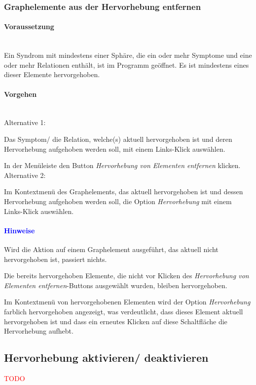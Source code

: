 \documentclass[enabledeprecatedfontcommands,fontsize=11pt,paper=a4,twoside]{scrartcl}
\newcommand*{\red}{\textcolor{red}}
\newcounter{one}
\newcounter{two}[one]
\newcommand*{\hint}{\paragraph{\textcolor{blue}{Hinweise}}}
\newcommand*{\condition}{\paragraph{Voraussetzung}$\;$ \vspace{0.2cm}\\}
\newcommand*{\actions}{\paragraph{Vorgehen} $\;$\vspace{0.2cm}\\}
\newcommand*{\aOne}{\textcolor{bbe}{Alternative 1:}}
\newcommand*{\aTwo}{\textcolor{bbe}{Alternative 2:}}
\let\tempone\itemize
\let\temptwo\enditemize
\renewenvironment{itemize}{\tempone\addtolength{\itemsep}{-10.0pt}}{\temptwo}
\let\origenumerate\enumerate
\let\origendenumerate\endenumerate
\renewenvironment{enumerate}{\origenumerate \addtolength{\itemsep}{-10.0pt}}{\origendenumerate}
\begin{document}
\subsubsection{Graphelemente aus der Hervorhebung entfernen}
		\condition 	
		Ein Syndrom mit mindestens einer Sphäre, die ein oder mehr Symptome und eine oder mehr Relationen enthält, ist im Programm geöffnet. Es ist mindestens eines dieser Elemente hervorgehoben.
		\actions
		\aOne
		\begin{enumerate}
			\item Das Symptom/ die Relation, welche(s) aktuell hervorgehoben ist und deren Hervorhebung aufgehoben werden soll, mit einem Links-Klick auswählen. 
			\item In der Menüleiste den Button \textit{Hervorhebung von Elementen entfernen} klicken.
		\end{enumerate}
		\aTwo
		\begin{enumerate}
			\item Im Kontextmenü des Graphelements, das aktuell hervorgehoben ist und dessen Hervorhebung aufgehoben werden soll, die Option \textit{Hervorhebung} mit einem Links-Klick auswählen.
		\end{enumerate}
		\hint
		\begin{itemize}
			\item Wird die Aktion auf einem Graphelement ausgeführt, das aktuell nicht hervorgehoben ist, passiert nichts.
			\item Die bereits hervorgehoben Elemente, die nicht vor Klicken des \textit{Hervorhebung von Elementen entfernen}-Buttons ausgewählt wurden, bleiben hervorgehoben.
			\item Im Kontextmenü von hervorgehobenen Elementen wird der Option \textit{Hervorhebung}  farblich hervorgehoben angezeigt, was verdeutlicht, dass dieses Element aktuell hervorgehoben ist und dass ein erneutes Klicken auf diese Schaltfläche die Hervorhebung aufhebt. \\
		\end{itemize}
	
\subsection{Hervorhebung aktivieren/ deaktivieren}
\red{TODO}
\end{document}
